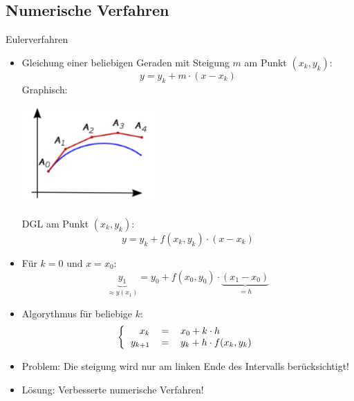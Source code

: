 \subsection{Numerische Verfahren}
\begin{definition}{Eulerverfahren}
  \begin{itemize}
    \item Gleichung einer beliebigen Geraden mit Steigung \(m\) am Punkt \((x_k,y_k)\):
      \[y=y_k+m\cdot(x-x_k)\] 
      Graphisch:
  \begin{center}
  \includegraphics[width=0.4\textwidth]{images/Newtonverfahren.png}
  \end{center}
      DGL am Punkt \((x_k,y_k)\):
      \[y=y_k+f(x_k,y_k)\cdot (x-x_k)\]
    \item Für \(k=0 \text{ und } x=x_0\):
      \[\underbrace{y_1}_{\approx y(x_1)}=y_0+f(x_0,y_0)\cdot\underbrace{(x_1-x_0)}_{=h}\]
    \item Algorythmus für beliebige \(k\):
      \[\left\{\begin{tabular}{rcl}
	  \(x_k\)&\(=\)&\(x_0+k\cdot h\)\\
	  \(y_{k+1}\)&\(=\)&\(y_k+h\cdot f(x_k,y_k)\)
	\end{tabular}
      \right.\]
    \item Problem: Die steigung wird nur am linken Ende des Intervalls berücksichtigt!
    \item Lösung: Verbesserte numerische Verfahren!
  \end{itemize}
\end{definition}
